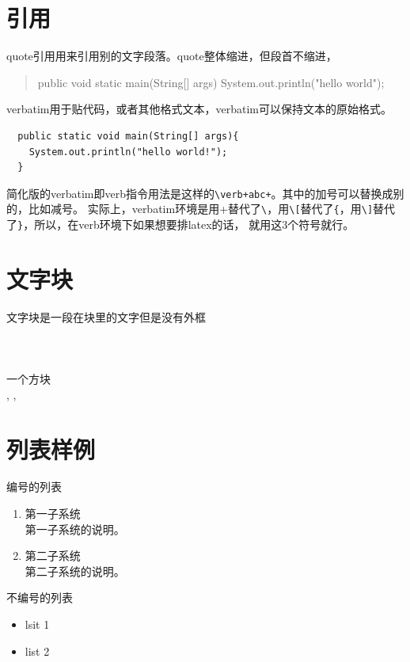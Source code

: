 \documentclass[a4paper,12pt]{article} %
\begin{document}
 \section{引用}
 quote引用用来引用别的文字段落。quote整体缩进，但段首不缩进，
 \begin{quote}
   public void static main(String[] args){
     System.out.println("hello world");
   }
  \end{quote}
 
 verbatim用于贴代码，或者其他格式文本，verbatim可以保持文本的原始格式。
\begin{verbatim}
  public static void main(String[] args){
    System.out.println("hello world!");
  }
\end{verbatim}
 简化版的verbatim即verb指令用法是这样的\verb-\verb+abc+-。其中的加号可以替换成别的，比如减号。
 实际上，verbatim环境是用+替代了\verb-\-，用\verb-\[-替代了\verb-{-，用\verb-\]-替代了\verb-}-，所以，在verb环境下如果想要排latex的话， 就用这3个符号就行。


 \section{文字块}
 \mbox{文字块是一段在块里的文字\\但是没有外框}\\
 \\
 \\
 \\
 一个方块
 \framebox{\rule{3mm}{0pt}\rule{0pt}{3mm}}\\
 \newsavebox{\savbox}
 \usebox{\savbox}, \usebox{\savbox}, \usebox{\savbox}\\

 
 \section{列表样例}
 编号的列表
 \begin{enumerate}
  \item 第一子系统\\
  第一子系统的说明。
  \item 第二子系统\\
  第二子系统的说明。
 \end{enumerate}

 不编号的列表
 \begin{itemize} %
 \item lsit 1
 \item list 2
 \end{itemize}
 
\end{document}

